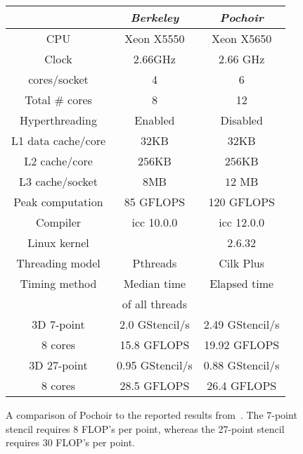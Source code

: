\begin{figure}
\center
\small
\begin{tabular}{|c|c|c|}
\hline
                 & \textit{Berkeley}  & \textit{Pochoir}    \\ \hline
CPU              & Xeon X5550& Xeon X5650 \\
Clock            & $2.66$GHz & $2.66$ GHz \\
cores/socket     & 4         & 6          \\ 
Total \# cores   & 8         & 12         \\
Hyperthreading   & Enabled   & Disabled   \\
L1 data cache/core& $32$KB   &  $32$KB    \\
L2 cache/core    & $256$KB   & $256$KB    \\
L3 cache/socket  & $8$MB     & $12$ MB    \\
Peak computation & 85 GFLOPS & 120 GFLOPS \\ \hline
Compiler         & icc 10.0.0& icc 12.0.0 \\
Linux kernel     &           & 2.6.32     \\ 
Threading model  & Pthreads  & Cilk Plus  \\ 
Timing method    & Median time    & Elapsed time    \\ 
                 & of all threads &  \\ \hline
3D 7-point & 2.0 GStencil/s & 2.49 GStencil/s \\
8 cores    & 15.8 GFLOPS     & 19.92 GFLOPS \\ \hline
3D 27-point& 0.95 GStencil/s & 0.88 GStencil/s \\
8 cores    & 28.5 GFLOPS     & 26.4 GFLOPS \\ \hline
\end{tabular}
\caption{A comparison of Pochoir to the reported results
  from~\cite{Datta09}.  The 7-point stencil requires 8 FLOP's per
  point, whereas the 27-point stencil requires 30 FLOP's per point.}
\label{fig:berkeley}
\end{figure}

